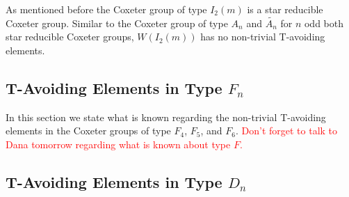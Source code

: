 As mentioned before the Coxeter group of type $I_2(m)$ is a star reducible Coxeter group. Similar to the Coxeter group of type $A_n$ and $\widetilde{A_n}$ for $n$ odd both star reducible Coxeter groups, $W(I_2(m))$ has no non-trivial T-avoiding elements. 


\subsection{T-Avoiding Elements in Type $F_n$}

In this section we state what is known regarding the non-trivial T-avoiding elements in the Coxeter groups of type $F_4$, $F_5$, and $F_6$. \textcolor{red}{Don't forget to talk to Dana tomorrow regarding what is known about type $F$.}


\subsection{T-Avoiding Elements in Type $D_n$}
